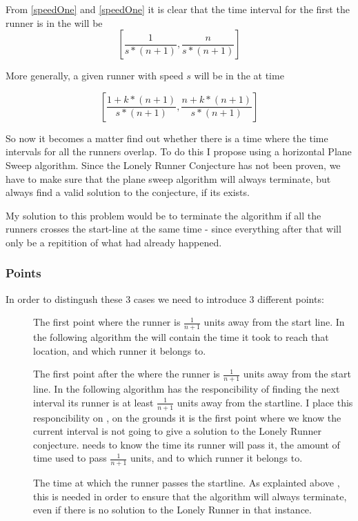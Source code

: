 From \ref{speedOne} and \ref{speedOne} it is clear that the time interval for the first the runner is in the \zone will be 
\begin{displaymath}
\left[\frac{1}{s * (n+1)}, \frac{n}{s * (n+1)}\right]
\end{displaymath}

More generally, a given runner with speed $s$ will be in the \zone at time 

\begin{displaymath}
\left[\frac{1 + k * (n+1)}{s * (n+1)}, \frac{n + k * (n+1)}{s * (n+1)}\right] 
\end{displaymath}

So now it becomes a matter find out whether there is a time where the time intervals for all the runners overlap. To do this I propose using a horizontal Plane Sweep algorithm. Since the Lonely Runner Conjecture has not been proven, we have to make sure that the plane sweep algorithm will always terminate, but always find a valid solution to the conjecture, if its exists.

My solution to this problem would be to terminate the algorithm if all the runners crosses the start-line at the same time - since everything after that will only be a repitition of what had already happened.

\subsubsection{Points}

In order to distingush these 3 cases we need to introduce 3 different points:
\begin{description}
\item[\comStart] The first point where the runner is $\frac{1}{n + 1}$ units away from the start line. In the following algorithm the \comStart will contain the time it took to reach that location, and which runner it belongs to.
\item[\comEnd] The first point after the \comStart where the runner is $\frac{1}{n + 1}$ units away from the start line. In the following algorithm \comEnd has the responcibility of finding the next interval its runner is at least $\frac{1}{n+1}$ units away from the startline. I place this responcibility on \comEnd, on the grounds it is the first point where we know the current interval is not going to give a solution to the Lonely Runner conjecture. \comEnd needs to know the time its runner will pass it, the amount of time used to pass $\frac{1}{n+1}$ units, and to which runner it belongs to.
\item[\comFin] The time at which the runner passes the startline. As explainted above , this is needed in order to ensure that the algorithm will always terminate, even if there is no solution to the Lonely Runner in that instance.
\end{description}

